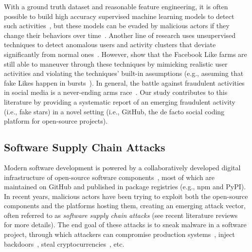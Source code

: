 With a ground truth dataset and reasonable feature engineering, it is often possible to build high accuracy supervised machine learning models to detect such activities~\citep[e.g.,][]{DBLP:conf/imc/StringhiniWEKVZZ13, DBLP:conf/ccs/SongLK15, DBLP:conf/ccs/XiaoFH15}, but these models can be evaded by malicious actors if they change their behaviors over time~\cite{DBLP:conf/uss/WangWZZ14, DBLP:conf/www/CresciPPST17}.
Another line of research uses unsupervised techniques to detect anomalous users and activity clusters that deviate significantly from normal ones~\cite{DBLP:conf/www/BeutelXGPF13, DBLP:conf/ccs/CaoYYP14, DBLP:conf/uss/ViswanathBCGGKM14, DBLP:conf/kdd/HooiSBSSF16}.
However, \citet{DBLP:journals/tissec/IkramOFCFJKS17} show that the Facebook Like farms are still able to maneuver through these techniques by mimicking realistic user activities and violating the techniques' built-in assumptions (e.g., assuming that fake Likes happen in bursts~\cite{DBLP:conf/www/BeutelXGPF13}).
In general, the battle against fraudulent activities in social media is a never-ending arms race~\cite{DBLP:conf/www/CresciPPST17, yang2019arming}.
Our study contributes to this literature by providing a systematic report of an emerging fraudulent activity (i.e., fake stars) in a novel setting (i.e., GitHub, the de facto social coding platform for open-source projects).

\subsection{Software Supply Chain Attacks}
\label{sec:supply-chain-security}

Modern software development is powered by a collaboratively developed digital infrastructure of open-source software components~\cite{eghbal2016roads}, 
most of which are maintained on GitHub and published in package registries (e.g., npm and PyPI).
In recent years, malicious actors have been trying to exploit both the open-source components and the platforms hosting them, creating an emerging attack vector, often referred to as \emph{software supply chain attacks} (see recent literature reviews~\cite{DBLP:conf/dimva/OhmPS020, DBLP:conf/sp/LadisaPMB23} for more details).
The end goal of these attacks is to sneak malware in a software project,  through which attackers can compromise production systems~\cite{wolff2021navigating}, inject backdoors~\cite{xz-attack}, steal cryptocurrencies~\cite{crypto-attack}, etc.

